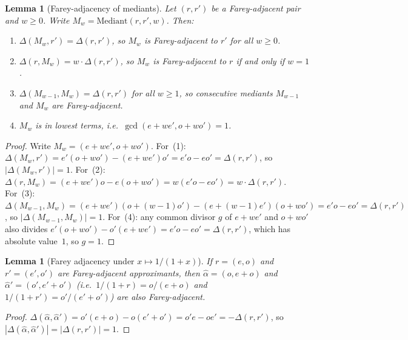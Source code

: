 \documentclass[12pt]{article}
\newtheorem{lemma}[theorem]{Lemma}
\theoremstyle{definition}
\theoremstyle{remark}
\theoremstyle{plain}
\begin{document}
\begin{lemma}[Farey-adjacency of mediants]
\label{lem:mediant-farey}
Let $(r, r')$ be a Farey-adjacent pair and $w \geq 0$.  Write
$M_w = \mathrm{Mediant}(r, r', w)$.  Then:
\begin{enumerate}
\item $\Delta(M_w, r') = \Delta(r, r')$,
      so $M_w$ is Farey-adjacent to $r'$ for all $w \geq 0$.
\item $\Delta(r, M_w) = w \cdot \Delta(r, r')$,
      so $M_w$ is Farey-adjacent to $r$ if and only if $w = 1$.
\item $\Delta(M_{w-1}, M_w) = \Delta(r, r')$ for all $w \geq 1$,
      so consecutive mediants $M_{w-1}$ and $M_w$ are Farey-adjacent.
\item $M_w$ is in lowest terms, i.e.\ $\gcd(e + we', o + wo') = 1$.
\end{enumerate}
\end{lemma}
\begin{proof}
Write $M_w = (e + we', o + wo')$.
For~(1): $\Delta(M_w, r') = e'(o + wo') - (e + we')o' = e'o - eo' = \Delta(r, r')$,
so $|\Delta(M_w, r')| = 1$.
For~(2): $\Delta(r, M_w) = (e + we')o - e(o + wo') = w(e'o - eo') = w \cdot \Delta(r, r')$.
For~(3): $\Delta(M_{w-1}, M_w) = (e+we')(o+(w-1)o') - (e+(w-1)e')(o+wo')
= e'o - eo' = \Delta(r,r')$, so $|\Delta(M_{w-1},M_w)| = 1$.
For~(4): any common divisor $g$ of $e + we'$ and $o + wo'$ also divides
$e'(o+wo') - o'(e+we') = e'o - eo' = \Delta(r,r')$, which has absolute value~$1$,
so $g = 1$.
\end{proof}

\begin{lemma}[Farey adjacency under $x \mapsto 1/(1+x)$]
\label{lem:farey-image}
If $r = (e, o)$ and $r' = (e', o')$ are Farey-adjacent approximants, then
$\hat{\alpha} = (o, e+o)$ and $\hat{\alpha}' = (o', e'+o')$
(i.e.\ $1/(1+r) = o/(e+o)$ and $1/(1+r') = o'/(e'+o')$)
are also Farey-adjacent.
\end{lemma}
\begin{proof}
$\Delta(\hat{\alpha}, \hat{\alpha}') = o'(e+o) - o(e'+o') = o'e - oe' = -\Delta(r, r')$,
so $|\Delta(\hat{\alpha}, \hat{\alpha}')| = |\Delta(r, r')| = 1$.
\end{proof}
\end{document}
